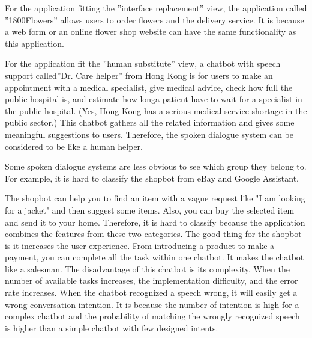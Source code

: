 \documentclass[12pt]{article}
\newenvironment{problem}[2][Problem]{\begin{trivlist}
\item[\hskip \labelsep {\bfseries #1}\hskip \labelsep {\bfseries #2.}]}{\end{trivlist}}
\begin{document}
\begin{problem}{3.2}
    For the application fitting the ”interface replacement” view, the application
    called ”1800Flowers” allows users to order flowers and the delivery service.
    It is because a web form or an online flower shop website can have the same 
    functionality as this application.

    For the application fit the ”human substitute” view, a chatbot with speech 
    support called”Dr. Care helper” from Hong Kong is for users to make an 
    appointment with a medical specialist, give medical advice, 
    check how full the public hospital is, and estimate how longa patient have 
    to wait for a specialist in the public hospital. 
    (Yes, Hong Kong has a serious medical service shortage in the public sector.) 
    This chatbot gathers all the related information and gives some meaningful 
    suggestions to users. 
    Therefore, the spoken dialogue system can be considered to be like a human helper.

    Some spoken dialogue systems are less obvious to see which group they belong to. 
    For example, it is hard to classify the shopbot from eBay and Google Assistant. 
    
    The shopbot can help you to find an item with a vague request like 
    "I am looking for a jacket" and then suggest some items. 
    Also, you can buy the selected item and send it to your home. 
    Therefore, it is hard to classify because the application combines 
    the features from these two categories. 
    The good thing for the shopbot is it increases the user experience. 
    From introducing a product to make a payment, you can complete all the task
    within one chatbot. It makes the chatbot like a salesman. 
    The disadvantage of this chatbot is its complexity. 
    When the number of available tasks increases, the implementation difficulty,
    and the error rate increases. 
    When the chatbot recognized a speech wrong, it will easily get a wrong 
    conversation intention. It is because the number of intention is high for a complex 
    chatbot and the probability of matching the wrongly recognized speech is higher
    than a simple chatbot with few designed intents.


\end{problem}
\end{document}
